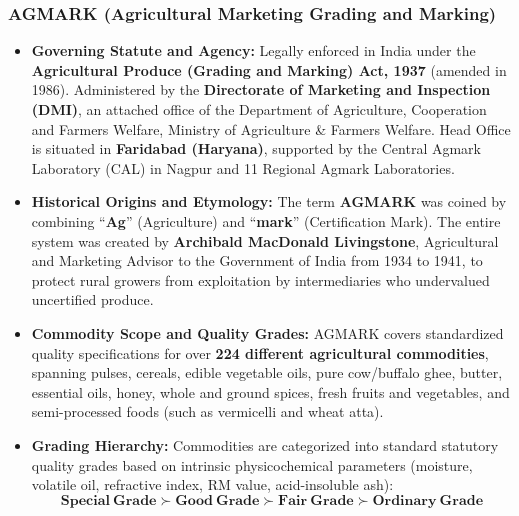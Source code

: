 \documentclass[11pt,a4paper,oneside]{article}
\begin{document}
\subsubsection{AGMARK (Agricultural Marketing Grading and Marking)}
\begin{itemize}[leftmargin=*]
    \item \textbf{Governing Statute and Agency:} Legally enforced in India under the \textbf{Agricultural Produce (Grading and Marking) Act, 1937} (amended in 1986). Administered by the \textbf{Directorate of Marketing and Inspection (DMI)}, an attached office of the Department of Agriculture, Cooperation and Farmers Welfare, Ministry of Agriculture \& Farmers Welfare. Head Office is situated in \textbf{Faridabad (Haryana)}, supported by the Central Agmark Laboratory (CAL) in Nagpur and 11 Regional Agmark Laboratories.
    \item \textbf{Historical Origins and Etymology:} The term \textbf{AGMARK} was coined by combining ``\textbf{Ag}'' (Agriculture) and ``\textbf{mark}'' (Certification Mark). The entire system was created by \textbf{Archibald MacDonald Livingstone}, Agricultural and Marketing Advisor to the Government of India from 1934 to 1941, to protect rural growers from exploitation by intermediaries who undervalued uncertified produce.
    \item \textbf{Commodity Scope and Quality Grades:} AGMARK covers standardized quality specifications for over \textbf{224 different agricultural commodities}, spanning pulses, cereals, edible vegetable oils, pure cow/buffalo ghee, butter, essential oils, honey, whole and ground spices, fresh fruits and vegetables, and semi-processed foods (such as vermicelli and wheat atta).
    \item \textbf{Grading Hierarchy:} Commodities are categorized into standard statutory quality grades based on intrinsic physicochemical parameters (moisture, volatile oil, refractive index, RM value, acid-insoluble ash):
    $$\mathbf{Special\ Grade} \succ \mathbf{Good\ Grade} \succ \mathbf{Fair\ Grade} \succ \mathbf{Ordinary\ Grade}$$
\end{itemize}
\end{document}
